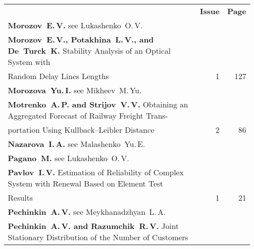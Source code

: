 \def\leftfootline{\small{\textbf{\thepage}
\hfill INFORMATIKA I EE PRIMENENIYA~--- INFORMATICS AND APPLICATIONS\ \ \ 2014\
\ \ volume~8\ \ \ issue\ 4}
}%
 \def\rightfootline{\small{INFORMATIKA I EE PRIMENENIYA~---
INFORMATICS AND APPLICATIONS\ \ \ 2014\ \ \ volume~8\ \ \ issue\ 4
\hfill \textbf{\thepage}}}

\def\leftkol{2014 AUTHOR INDEX} %

\def\rightkol{2014 AUTHOR INDEX} %


{\tabcolsep=3pt
\begin{tabular}{p{397pt}rr}
&\textbf{Issue} & \textbf{Page}\\[6pt]
\textbf{Morozov~E.\,V.} see Lukashenko~O.\,V.&&\\[0.65pt]
\textbf{Morozov~E.\,V., Potakhina~L.\,V., and De~Turck~K.} Stability Analysis of an Optical
System with\linebreak
\vspace*{-12pt}\\[0.65pt]
\hspace*{23pt}Random Delay Lines Lengths\dotfill&1&127\\[0.65pt]
\textbf{Morozova~Yu.\,I.} see Mikheev~M.\,Yu.&&\\[0.65pt]
\textbf{Motrenko~A.\,P. and Strijov~V.\,V.} Obtaining an Aggregated Forecast of Railway
Freight Trans-\linebreak
\vspace*{-12pt}\\[0.65pt]
\hspace*{23pt}portation Using Kullback--Leibler Distance\dotfill&2&86\\[0.65pt]
\textbf{Nazarova~I.\,A.} see Malashenko~Yu.\,E.&&\\[0.65pt]
\textbf{Pagano~M.} see Lukashenko~O.\,V.&&\\[0.65pt]
\textbf{Pavlov~I.\,V.} Estimation of Reliability of Complex System with Renewal Based on
Element Test\linebreak
\vspace*{-12pt}\\[0.65pt]
\hspace*{23pt}Results\dotfill&1&21\\[0.65pt]
\textbf{Pechinkin~A.\,V.} see Meykhanadzhyan~L.\,A.&&\\[0.65pt]
\textbf{Pechinkin~A.\,V. and Razumchik~R.\,V.} Joint Stationary Distribution of the Number of
Customers\linebreak
\vspace*{-12pt}\\[0.65pt]

\end{tabular}}
